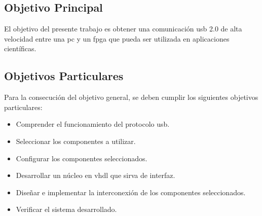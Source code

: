 \subsection{Objetivo Principal}
	El objetivo del presente trabajo es obtener una comunicación \acrshort{usb} 2.0 de alta velocidad entre una \acrshort{pc} y un \acrshort{fpga} que pueda ser utilizada en aplicaciones científicas.%
	
\subsection{Objetivos Particulares}
	Para la consecución del objetivo general, se deben cumplir los siguientes objetivos particulares:
	
	\begin{itemize}
		\item Comprender el funcionamiento del protocolo \acrshort{usb}.
		\item Seleccionar los componentes a utilizar.
		\item Configurar los componentes seleccionados.
		\item Desarrollar un núcleo en \acrshort{vhdl} que sirva de interfaz.
		\item Diseñar e implementar la interconexión de los componentes seleccionados.
		\item Verificar el sistema desarrollado.
	\end{itemize}